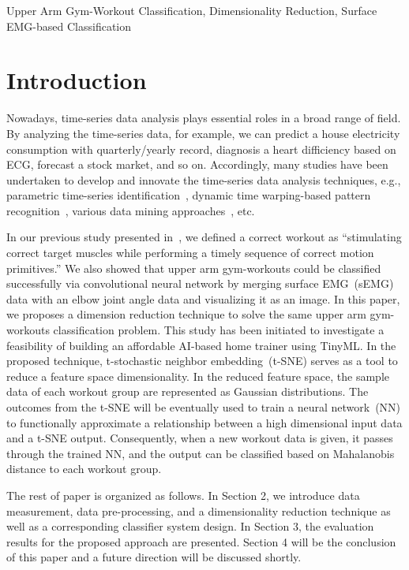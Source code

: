 \documentclass{ISIS}
\begin{document}
\begin{keywords}
Upper Arm Gym-Workout Classification, Dimensionality Reduction, Surface EMG-based Classification 
\end{keywords}
\maketitle


\section{Introduction}
%
Nowadays, time-series data analysis plays essential roles in a broad range of field. By analyzing the time-series data, for example, we can predict a house electricity consumption with quarterly/yearly record, diagnosis a heart difficiency based on ECG, forecast a stock market, and so on. Accordingly, many studies have been undertaken to develop and innovate the time-series data analysis techniques, e.g., parametric time-series identification~\cite{Astrom}, dynamic time warping-based pattern recognition~\cite{Berndt}, various data mining approaches~\cite{TcFu}, etc.   

In our previous study presented in~\cite{JHYoo}, we defined a correct workout as ``stimulating correct target muscles while performing a timely sequence of correct motion primitives.'' We also showed that upper arm gym-workouts could be classified successfully via convolutional neural network by merging surface EMG~(sEMG) data with an elbow joint angle data and visualizing it as an image. In this paper, we proposes a dimension reduction technique to solve the same upper arm gym-workouts classification problem. This study has been initiated to investigate a feasibility of building an affordable AI-based home trainer using TinyML. In the proposed technique, t-stochastic neighbor embedding~(t-SNE) serves as a tool to reduce a feature space dimensionality. In the reduced feature space, the sample data of each workout group are represented as Gaussian distributions. 
%
The outcomes from the t-SNE will be eventually used to train a neural network~(NN) to functionally approximate a relationship between a high dimensional input data and a t-SNE output. Consequently, when a new workout data is given, it passes through the trained NN, and the output can be classified based on Mahalanobis distance to each workout group.
%

The rest of paper is organized as follows. In Section 2, we introduce data measurement, data pre-processing, and a dimensionality reduction technique as well as a corresponding classifier system design. In Section 3, the evaluation results for the proposed approach are presented. Section 4 will be the conclusion of this paper and a future direction will be discussed shortly. 
\end{document}
